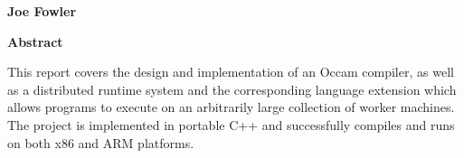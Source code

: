 \thispagestyle{plain}

\begin{center}
  \vspace*{2cm}
  \Large
  \textbf{\projecttitle}

  \vspace{0.4cm}
  \large \projectsubtitle

  \vspace{0.4cm}
  \textbf{Joe Fowler}

  \vspace{2cm}
  \textbf{Abstract}

  \vspace{0.5cm}
  This report covers the design and implementation of an Occam compiler, as well
  as a distributed runtime system and the corresponding language extension which
  allows programs to execute on an arbitrarily large collection of worker
  machines. The project is implemented in portable C++ and successfully compiles
  and runs on both x86 and ARM platforms.
\end{center}
